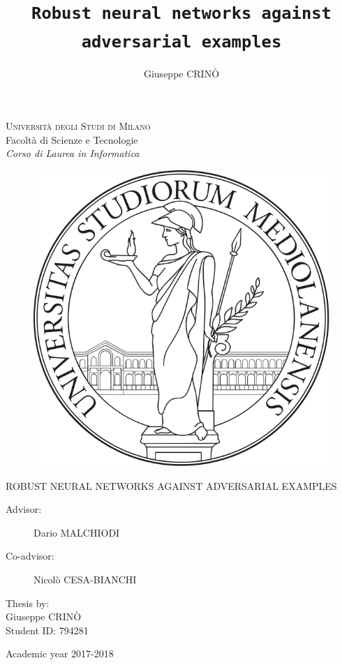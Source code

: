 \documentclass{mimosis}
\title{\texttt{Robust neural networks against adversarial examples}}
\author{Giuseppe CRIN\`O}
\begin{document}
\frontmatter
  \begin{titlepage}
  \begin{center}
      \Large
      \textsc{Universit\`a degli Studi di Milano} \\
      Facolt\`a di Scienze e Tecnologie \\
      \emph{Corso di Laurea in Informatica}
  \end{center}
  \begin{figure}[H]
    \centering
    \includegraphics[width=0.5\linewidth]{Images/logo-unimi.png}
  \end{figure}
	\begin{center}
		\Large ROBUST NEURAL NETWORKS AGAINST ADVERSARIAL EXAMPLES
	\end{center}
	\vfill
  \begin{description}
  \item[Advisor:] Dario MALCHIODI
  \item[Co-advisor:] Nicol\`o CESA-BIANCHI
  \end{description}
        \null\hfill
        \parbox{3in} {
          Thesis by: \\
          \expandafter{Giuseppe CRIN\`O} \\ 
          Student ID: 794281
        }
        \vfill
	\begin{center}
    \Large Academic year 2017-2018
  \end{center}
  \end{titlepage}

  \newpage
  \null
  \thispagestyle{empty}
  \newpage

  \tableofcontents

\mainmatter

  
  
  
  
  

\backmatter

  \printbibliography[heading=bibintoc,title={References}]
\end{document}
